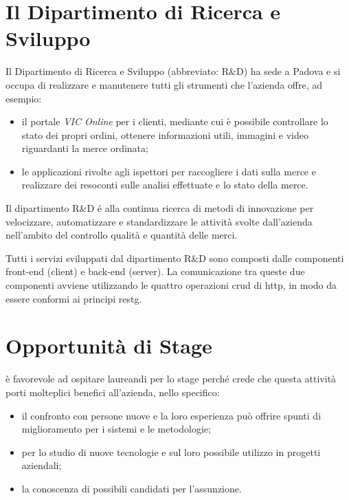 \section{Il Dipartimento di Ricerca e Sviluppo} %
	Il Dipartimento di Ricerca e Sviluppo (abbreviato: R\&D) ha sede a Padova e si occupa di realizzare e manutenere tutti gli strumenti che l'azienda offre, ad esempio:
	\begin{itemize}
		\item il portale \emph{VIC Online} per i clienti, mediante cui è possibile controllare lo stato dei propri ordini, ottenere informazioni utili, immagini e video riguardanti la merce ordinata;
		\item le applicazioni rivolte agli ispettori per raccogliere i dati sulla merce e realizzare dei resoconti sulle analisi effettuate e lo stato della merce.
	\end{itemize}
	 
	Il dipartimento R\&D é alla continua ricerca di metodi di innovazione per velocizzare, automatizzare e standardizzare le attività svolte dall’azienda nell’ambito del controllo qualità e quantità delle merci.
	
	Tutti i servizi sviluppati dal dipartimento R\&D sono
	composti dalle componenti front-end (client) e back-end (server). La comunicazione tra
	queste due componenti avviene utilizzando le quattro operazioni \gls{crud} di \gls{http}, in modo da essere conformi ai principi \gls{restg}.

\section{Opportunità di Stage} %
	\vic{} è favorevole ad ospitare laureandi per lo stage perché crede che questa attività porti molteplici benefici all’azienda, nello specifico: \\
	\begin{itemize}
		\item il confronto con persone nuove e la loro esperienza può offrire spunti di miglioramento per i sistemi e le metodologie;
		\item per lo studio di nuove tecnologie e sul loro possibile utilizzo in progetti aziendali;
		\item la conoscenza di possibili candidati per l’assunzione.
	\end{itemize}
